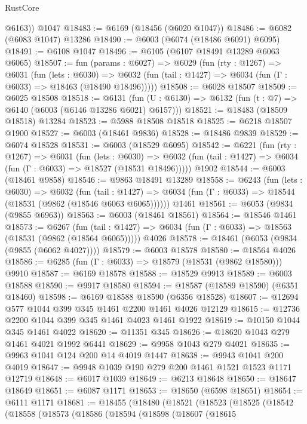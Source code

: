 \begin{lexlean}{RustCore}
\begin{coremodule}
        @6163))
    @1047
@18483 := @6169 (@18456 (@6020 @1047))
@18486 := @6082 (@6083 @1047) @13286
@18490 := @6003 (@6074 (@18486 @6091) @6095)
@18491 := @6108 @1047
@18496 := @6105 (@6107 @18491 @13289 @6063 @6065)
@18507 := fun (params : @6027) =>
  @6029
    (fun (rty : @1267) =>
    @6031
      (fun (lets : @6030) =>
      @6032 (fun (tail : @1427) => @6034 (fun (Γ : @6033) => @18463 (@18490 @18496)))))
@18508 := @6028 @18507
@18509 := @6025 @18508
@18518 := @6131
    (fun (U : @6130) => @6132 (fun (t : @7) => @6140 (@6003 (@6146 @13286 @6021) @6157)))
@18521 := @18483 (@18509 @18518) @13284
@18523 := @5988 @18508 @18518
@18525 := @6218 @18507 @1900
@18527 := @6003 (@18461 @9836)
@18528 := @18486 @9839
@18529 := @6074 @18528
@18531 := @6003 (@18529 @6095)
@18542 := @6221
    (fun (rty : @1267) =>
    @6031
      (fun (lets : @6030) =>
      @6032 (fun (tail : @1427) => @6034 (fun (Γ : @6033) => @18527 (@18531 @18496)))))
    @1902
@18544 := @6003 (@18461 @9858)
@18546 := @9863 @18491 @13289
@18558 := @6243
    (fun (lets : @6030) =>
    @6032
      (fun (tail : @1427) =>
      @6034 (fun (Γ : @6033) => @18544 (@18531 (@9862 (@18546 @6063 @6065))))))
    @1461
@18561 := @6053 (@9834 (@9855 @6963))
@18563 := @6003 (@18461 @18561)
@18564 := @18546 @1461
@18573 := @6267
    (fun (tail : @1427) => @6034 (fun (Γ : @6033) => @18563 (@18531 (@9862 (@18564 @6065)))))
    @4026
@18578 := @18461 (@6053 (@9834 (@9855 (@6062 @4027))))
@18579 := @6003 @18578
@18580 := @18564 @4026
@18586 := @6285 (fun (Γ : @6033) => @18579 (@18531 (@9862 @18580))) @9910
@18587 := @6169 @18578
@18588 := @18529 @9913
@18589 := @6003 @18588
@18590 := @9917 @18580
@18594 := @18587 (@18589 @18590) (@6351 @18460)
@18598 := @6169 @18588 @18590 (@6356 @18528)
@18607 := @12694 @577 @1044 @399 @345 @1461 @2200 @1461 @4026 @12129
@18615 := @12736 @2200 @1044 @399 @345 @1461 @4023 @1461 @1922
@18619 := @10150 @1044 @345 @1461 @4022
@18620 := @11351 @345
@18626 := @18620 @1043 @279 @1461 @4021 @1992 @6441
@18629 := @9958 @1043 @279 @4021
@18635 := @9963 @1041 @124 @200 @14 @4019 @1447
@18638 := @9943 @1041 @200 @4019
@18647 := @9948 @1039 @190 @279 @200 @1461 @1521 @1523 @1171 @12719
@18648 := @6017 @1039
@18649 := @6213 @18648
@18650 := @18647 @18649
@18651 := @6087 @1171
@18653 := @18650 (@6598 @18651)
@18654 := @6111 @1171
@18681 := @18455
    (@18480
      (@18521
        (@18523
          (@18525
            (@18542
              (@18558
                (@18573
                  (@18586
                    (@18594
                      (@18598
                        (@18607
                          (@18615

\end{coremodule}
\end{lexlean}
